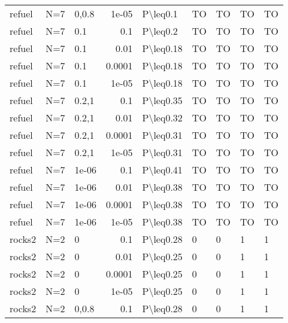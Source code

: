 \begin{longtable}{lllrlllll}
 refuel        & N=7       & 0,0.8 & 1e-05  & P\textbackslash{}leq0.1   & TO   & TO   & TO       & TO      \\
 refuel        & N=7       & 0.1   & 0.1    & P\textbackslash{}leq0.2   & TO   & TO   & TO       & TO      \\
 refuel        & N=7       & 0.1   & 0.01   & P\textbackslash{}leq0.18  & TO   & TO   & TO       & TO      \\
 refuel        & N=7       & 0.1   & 0.0001 & P\textbackslash{}leq0.18  & TO   & TO   & TO       & TO      \\
 refuel        & N=7       & 0.1   & 1e-05  & P\textbackslash{}leq0.18  & TO   & TO   & TO       & TO      \\
 refuel        & N=7       & 0.2,1 & 0.1    & P\textbackslash{}leq0.35  & TO   & TO   & TO       & TO      \\
 refuel        & N=7       & 0.2,1 & 0.01   & P\textbackslash{}leq0.32  & TO   & TO   & TO       & TO      \\
 refuel        & N=7       & 0.2,1 & 0.0001 & P\textbackslash{}leq0.31  & TO   & TO   & TO       & TO      \\
 refuel        & N=7       & 0.2,1 & 1e-05  & P\textbackslash{}leq0.31  & TO   & TO   & TO       & TO      \\
 refuel        & N=7       & 1e-06 & 0.1    & P\textbackslash{}leq0.41  & TO   & TO   & TO       & TO      \\
 refuel        & N=7       & 1e-06 & 0.01   & P\textbackslash{}leq0.38  & TO   & TO   & TO       & TO      \\
 refuel        & N=7       & 1e-06 & 0.0001 & P\textbackslash{}leq0.38  & TO   & TO   & TO       & TO      \\
 refuel        & N=7       & 1e-06 & 1e-05  & P\textbackslash{}leq0.38  & TO   & TO   & TO       & TO      \\
 rocks2        & N=2       & 0     & 0.1    & P\textbackslash{}leq0.28  & 0    & 0    & 1        & 1       \\
 rocks2        & N=2       & 0     & 0.01   & P\textbackslash{}leq0.25  & 0    & 0    & 1        & 1       \\
 rocks2        & N=2       & 0     & 0.0001 & P\textbackslash{}leq0.25  & 0    & 0    & 1        & 1       \\
 rocks2        & N=2       & 0     & 1e-05  & P\textbackslash{}leq0.25  & 0    & 0    & 1        & 1       \\
 rocks2        & N=2       & 0,0.8 & 0.1    & P\textbackslash{}leq0.28  & 0    & 0    & 1        & 1       \\

\end{longtable}
